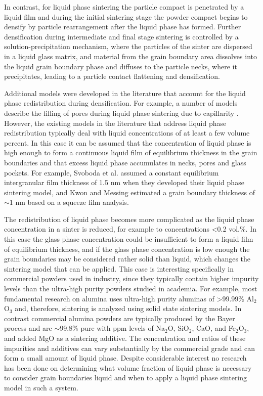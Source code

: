 In contrast, for liquid phase sintering \cite{Kingery2004} the particle compact is penetrated by a liquid film and during the initial sintering stage the powder compact begins to densify by particle rearrangement after the liquid phase has formed. Further densification during intermediate and final stage sintering is controlled by a solution-precipitation mechanism, where the particles of the sinter are dispersed in a liquid glass matrix, and material from the grain boundary area dissolves into the liquid grain boundary phase and diffuses to the particle necks, where it precipitates, leading to a particle contact flattening and densification.

Additional models were developed in the literature that account for the liquid phase redistribution during densification. For example, a number of models describe the filling of pores during liquid phase sintering due to capillarity \cite{Lee1998,Shaw1986}. However, the existing models in the literature that address liquid phase redistribution typically deal with liquid concentrations of at least a few volume percent. In this case it can be assumed that the concentration of liquid phase is high enough to form a continuous liquid film of equilibrium thickness \cite{Subramaniam2006,Clarke1987,Clarke1993} in the grain boundaries and that excess liquid phase accumulates in necks, pores and glass pockets. For example, Svoboda et al.\cite{Svoboda1996} assumed a constant equilibrium intergranular film thickness of 1.5 nm when they developed their liquid phase sintering model, and Kwon and Messing \cite{Kwon1991} estimated a grain boundary thickness of $\sim$1 nm based on a squeeze film analysis. 

The redistribution of liquid phase becomes more complicated as the liquid phase concentration in a sinter is reduced, for example to concentrations <0.2 vol.\%. In this case the glass phase concentration could be insufficient to form a liquid film of equilibrium thickness, and if the glass phase concentration is low enough the grain boundaries may be considered rather solid than liquid, which changes the sintering model that can be applied. This case is interesting specifically in commercial powders used in industry, since they typically contain higher impurity levels than the ultra-high purity powders studied in academia. For example, most fundamental research on alumina uses ultra-high purity aluminas of >99.99\% Al$_{2}$O$_{3}$ and, therefore, sintering is analyzed using solid state sintering models. In contrast commercial alumina powders are typically produced by the Bayer process and are $\sim$99.8\% pure with ppm levels of Na$_{2}$O, SiO$_{2}$, CaO, and Fe$_{2}$O$_{3}$, and added MgO as a sintering additive. The concentration and ratios of these impurities and additives can vary substantially by the commercial grade and can form a small amount of liquid phase. Despite considerable interest no research has been done on determining what volume fraction of liquid phase is necessary to consider grain boundaries liquid and when to apply a liquid phase sintering model in such a system. 

